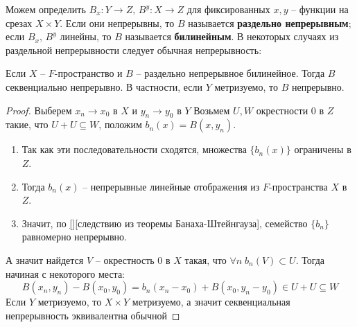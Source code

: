 \documentclass[12pt, a4paper, oneside]{book}
\begin{document}
Можем определить $B_x:Y\to Z,\, B^y:X \to Z$ для фиксированных $x,y$ -- функции на срезах $X\times Y$.  Если они непрерывны, то $B$ называется \textbf{раздельно непрерывным}; если $B_x, \, B^y$ линейны, то $B$ называется \textbf{билинейным}.
В некоторых случаях из раздельной непрерывности следует обычная непрерывность:
\begin{theorem}
    Если $X$ -- $F$-пространство и $B$ -- раздельно непрерывное билинейное. Тогда $B$ секвенциально непрерывно. В частности, если $Y$ метризуемо, то $B$ непрерывно.
\end{theorem}
\begin{proof}
    Выберем $x_n \to x_0$ в $X$ и $y_n \to y_0$ в $Y$
Возьмем $U, W$ окрестности 0 в $Z$ такие, что $U+U \subseteq W$, положим $b_n(x) = B(x,y_n)$.
    \begin{enumerate}
        \item  Так как эти последовательности сходятся, множества $\{b_n(x)\}$ ограничены в $Z$.
        \item  Тогда $b_n(x)$ --  непрерывные линейные отображения из $F$-пространства $X$ в $Z$.
        \item  Значит, по \ref{}[следствию из теоремы Банаха-Штейнгауза], семейство $\{b_n\}$ равномерно непрерывно.
    \end{enumerate}
    А значит найдется $V$ -- окрестность 0 в $X$ такая, что $\forall n\; b_n(V) \subset U$. Тогда начиная с некоторого места:
    $$B(x_n, y_n) - B(x_0,y_0) = b_n(x_n-x_0)+B(x_0,y_n-y_0) \in U + U \subseteq W$$
    Если $Y$ метризуемо, то $X\times Y$ метризуемо, а значит секвенциальная непрерывность эквивалентна обычной
\end{proof}
    
    
\end{document}
